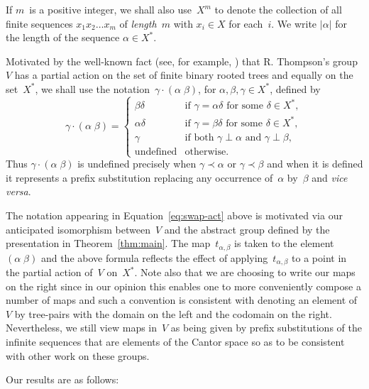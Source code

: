 \documentclass[a4paper,11pt]{article}
\numberwithin{equation}{section}
\newcommand{\length}[1]{\mathopen{|}#1\mathclose{|}}
\newcommand{\swap}[2]{(#1\;#2)}
\begin{document}
If $m$~is a positive integer, we shall also use~$X^{m}$ to denote the
collection of all finite sequences $x_{1}x_{2}\dots x_{m}$ of
\emph{length~$m$} with $x_{i} \in X$ for each~$i$.  We write
$\length{\alpha}$ for the length of the sequence $\alpha \in
X^{\ast}$.

Motivated by the well-known fact (see, for example, \cite{Dehornoy})
that R. Thompson's group $V$ has a partial action on the set of finite
binary rooted trees and equally on the set~$X^{\ast}$, we shall use
the notation~$\gamma \cdot \swap{\alpha}{\beta}$, for
$\alpha,\beta,\gamma \in X^{\ast}$, defined by
\begin{equation}
  \gamma \cdot \swap{\alpha}{\beta} =
  \begin{cases}
    \beta\delta &\text{if $\gamma = \alpha\delta$ for some $\delta \in
      X^{\ast}$}, \\
    \alpha\delta &\text{if $\gamma = \beta\delta$ for some $\delta \in
      X^{\ast}$}, \\
    \gamma &\text{if both $\gamma \perp \alpha$ and $\gamma \perp
      \beta$}, \\
    \text{undefined} &\text{otherwise}.
  \end{cases}
  \label{eq:swap-act}
\end{equation}
Thus $\gamma \cdot \swap{\alpha}{\beta}$ is undefined precisely when
$\gamma \prec \alpha$ or $\gamma \prec \beta$ and when it is defined
it represents a prefix substitution replacing any occurrence
of~$\alpha$ by~$\beta$ and \emph{vice versa}.

The notation appearing in Equation~\eqref{eq:swap-act} above is
motivated via our anticipated isomorphism between~$V$ and the abstract
group defined by the presentation in Theorem~\ref{thm:main}.  The
map~$t_{\alpha,\beta}$ is taken to the element~$\swap{\alpha}{\beta}$
and the above formula reflects the effect of
applying~$t_{\alpha,\beta}$ to a point in the partial action of~$V$
on~$X^{\ast}$.  Note also that we are choosing to write our maps on
the right since in our opinion this enables one to more conveniently
compose a number of maps and such a convention is consistent with
denoting an element of~$V$ by tree-pairs with the domain on the left
and the codomain on the right.  Nevertheless, we still view maps
in~$V$ as being given by prefix substitutions of the infinite
sequences that are elements of the Cantor space so as to be consistent
with other work on these groups.

Our results are as follows:
\end{document}
